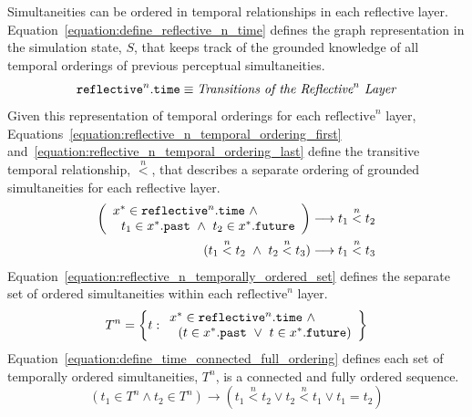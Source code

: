 Simultaneities can be ordered in temporal relationships in each
reflective layer.
{\mbox{Equation~\ref{equation:define_reflective_n_time}}} defines the
graph representation in the simulation state, $S$, that keeps track of
the grounded knowledge of all temporal orderings of previous
perceptual simultaneities.
\begin{equation}
\label{equation:define_reflective_n_time}
\text{\tt{reflective}}^n.\text{\tt{time}} \equiv \text{\emph{Transitions of the $\text{Reflective}^n$ Layer}}
\end{equation}
Given this representation of temporal orderings for each
$\text{reflective}^n$ layer,
{\mbox{Equations~\ref{equation:reflective_n_temporal_ordering_first}}}
{\mbox{and~\ref{equation:reflective_n_temporal_ordering_last}}} define
the transitive temporal relationship, $\stackrel{n}{<}$, that
describes a separate ordering of grounded simultaneities for each
reflective layer.
\begin{align}
\label{equation:reflective_n_temporal_ordering_first}
\left(\begin{array}{l}
  x^* \in \text{\tt{reflective}}^n.\text{\tt{time}} ~\wedge~ \\
  ~~t_1 \in x^*.\text{\tt{past}} ~\wedge~ t_2 \in x^*.\text{\tt{future}}
\end{array}\right) &\longrightarrow t_1 \stackrel{n}{<} t_2 \\
\label{equation:reflective_n_temporal_ordering_last}
(t_1 \stackrel{n}{<} t_2 ~\wedge~ t_2 \stackrel{n}{<} t_3) &\longrightarrow t_1 \stackrel{n}{<} t_3
\end{align}
{\mbox{Equation~\ref{equation:reflective_n_temporally_ordered_set}}}
defines the separate set of ordered simultaneities within each
$\text{reflective}^n$ layer.
\begin{equation}
\label{equation:reflective_n_temporally_ordered_set}
 T^n = \left\{t : 
\begin{array}{l}
  x^* \in \text{\tt{reflective}}^n.\text{\tt{time}} ~\wedge~ \\
  ~~(t \in x^*.\text{\tt{past}} ~\vee~ t \in x^*.\text{\tt{future}})
\end{array}\right\}
\end{equation}
{\mbox{Equation~\ref{equation:define_time_connected_full_ordering}}}
defines each set of temporally ordered simultaneities, $T^n$, is a
connected and fully ordered sequence.
\begin{equation}
\label{equation:define_time_connected_full_ordering}
(t_1 \in T^n \wedge t_2 \in T^n) \longrightarrow (t_1 \stackrel{n}{<} t_2 \vee t_2 \stackrel{n}{<} t_1 \vee t_1 = t_2)
\end{equation}
